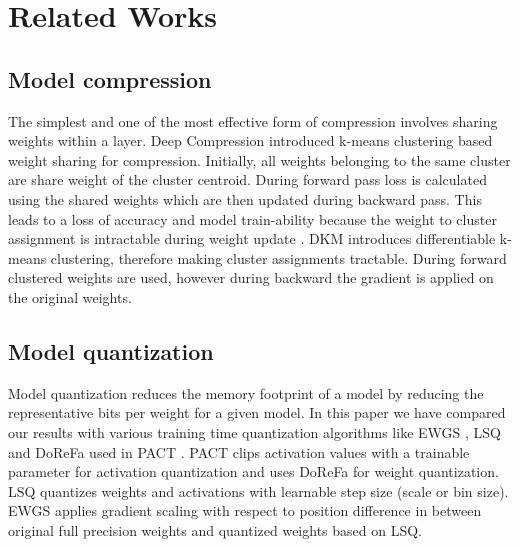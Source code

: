 \documentclass[10pt,twocolumn,letterpaper]{article}
\begin{document}
 \section{Related Works}
\label{related_works}

\subsection{Model compression}

The simplest and one of the most effective form of compression involves sharing weights within a layer. Deep Compression \cite{HanMD15} introduced k-means clustering based weight sharing for compression. Initially, all weights belonging to the same cluster are share weight of the cluster centroid. During forward pass loss is calculated using the shared weights which are then updated during backward pass. This leads to a loss of accuracy and model train-ability because the weight to cluster assignment is intractable during weight update \cite{yinl2019}. DKM \cite{cho2021dkm} introduces differentiable k-means clustering, therefore making cluster assignments tractable. During forward clustered weights are used, however during backward the gradient is applied on the original weights.

\subsection{Model quantization}
Model quantization reduces the memory footprint of a model by reducing the representative bits per weight for a given model. In this paper we have compared our results with various training time quantization algorithms like EWGS \cite{lee2021network}, LSQ \cite{esser2019learned} and DoReFa \cite{zhou2016dorefa} used in PACT \cite{choi2018pact}. PACT clips activation values with a trainable parameter for activation quantization and uses DoReFa for weight quantization. LSQ quantizes weights and activations with learnable step size (scale or bin size). EWGS applies gradient scaling with respect to position difference in between original full precision weights and quantized weights based on LSQ.
\end{document}
